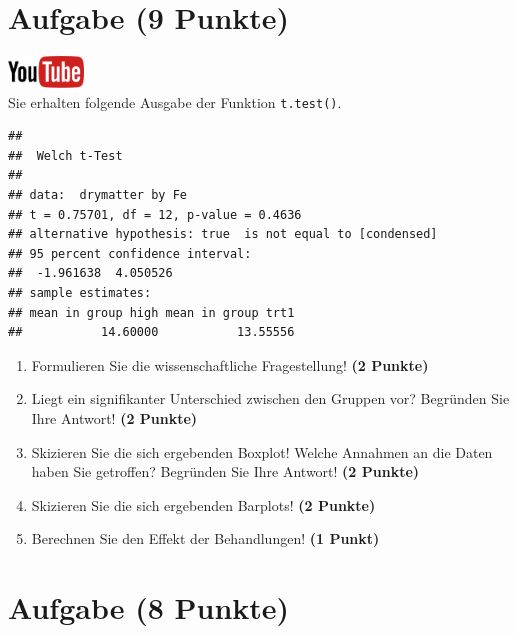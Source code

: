 \documentclass[a4paper, 9pt]{scrartcl}\usepackage[]{graphicx}\usepackage[]{xcolor}
\makeatletter
\newenvironment{kframe}{%
 \def\at@end@of@kframe{}%
 \ifinner\ifhmode%
  \def\at@end@of@kframe{\end{minipage}}%
  \begin{minipage}{\columnwidth}%
 \fi\fi%
 \def\FrameCommand##1{\hskip\@totalleftmargin \hskip-\fboxsep
 \colorbox{shadecolor}{##1}\hskip-\fboxsep
     \hskip-\linewidth \hskip-\@totalleftmargin \hskip\columnwidth}%
 \MakeFramed {\advance\hsize-\width
   \@totalleftmargin\z@ \linewidth\hsize
   \@setminipage}}%
 {\par\unskip\endMakeFramed%
 \at@end@of@kframe}
\newenvironment{knitrout}{}{} %
\makeatother
\begin{document}
\section{Aufgabe \hfill (9 Punkte)}

\hfill\href{https://youtu.be/w62HJlbN28U}{\includegraphics[width =
  2cm]{img/youtube}}\\[1Ex]

Sie erhalten folgende \Rlogo Ausgabe der Funktion \texttt{t.test()}.

\begin{knitrout}
\color{fgcolor}\begin{kframe}
\begin{verbatim}
## 
## 	Welch t-Test
## 
## data:  drymatter by Fe
## t = 0.75701, df = 12, p-value = 0.4636
## alternative hypothesis: true  is not equal to [condensed]
## 95 percent confidence interval:
##  -1.961638  4.050526
## sample estimates:
## mean in group high mean in group trt1 
##           14.60000           13.55556
\end{verbatim}
\end{kframe}
\end{knitrout}


\begin{enumerate}
  \item Formulieren Sie die wissenschaftliche Fragestellung! \textbf{(2
Punkte)}
\item Liegt ein signifikanter Unterschied zwischen den Gruppen vor?
  Begr{\"u}nden Sie Ihre Antwort! \textbf{(2 Punkte)}
\item Skizieren Sie die sich ergebenden Boxplot!
  Welche Annahmen an die Daten haben Sie getroffen? Begr{\"u}nden Sie Ihre
  Antwort! \textbf{(2 Punkte)} 
\item Skizieren Sie die sich ergebenden Barplots! \textbf{(2 Punkte)}
\item Berechnen Sie den Effekt der Behandlungen! \textbf{(1 Punkt)} 
\end{enumerate}
 
\clearpage

\section{Aufgabe \hfill (8 Punkte)}
\end{document}
